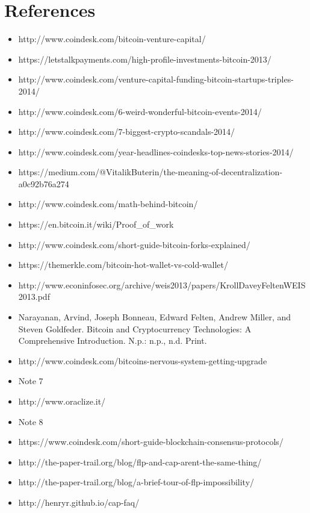 \documentclass[full.tex]{subfiles}
\begin{document}
    
    \setlength{\parindent}{0pt}
    
    \section*{References}
    \begin{itemize}
        \item http://www.coindesk.com/bitcoin-venture-capital/
        \item https://letstalkpayments.com/high-profile-investments-bitcoin-2013/ 
        \item http://www.coindesk.com/venture-capital-funding-bitcoin-startups-triples-2014/ 
        \item http://www.coindesk.com/6-weird-wonderful-bitcoin-events-2014/ 
        \item http://www.coindesk.com/7-biggest-crypto-scandals-2014/ 
        \item http://www.coindesk.com/year-headlines-coindesks-top-news-stories-2014/ 
        \item https://medium.com/@VitalikButerin/the-meaning-of-decentralization-a0c92b76a274 
        \item http://www.coindesk.com/math-behind-bitcoin/
        \item https://en.bitcoin.it/wiki/Proof\_of\_work
        \item http://www.coindesk.com/short-guide-bitcoin-forks-explained/
        \item https://themerkle.com/bitcoin-hot-wallet-vs-cold-wallet/
        \item http://www.econinfosec.org/archive/weis2013/papers/KrollDaveyFeltenWEIS2013.pdf
        \item Narayanan, Arvind, Joseph Bonneau, Edward Felten, Andrew Miller, and Steven Goldfeder. Bitcoin and Cryptocurrency Technologies: A Comprehensive Introduction. N.p.: n.p., n.d. Print.
        \item http://www.coindesk.com/bitcoins-nervous-system-getting-upgrade
        \item Note 7 
        \item http://www.oraclize.it/
        \item Note 8
        \item https://www.coindesk.com/short-guide-blockchain-consensus-protocols/
        \item http://the-paper-trail.org/blog/flp-and-cap-arent-the-same-thing/
        \item http://the-paper-trail.org/blog/a-brief-tour-of-flp-impossibility/
        \item http://henryr.github.io/cap-faq/
    \end{itemize}
    
\end{document}
